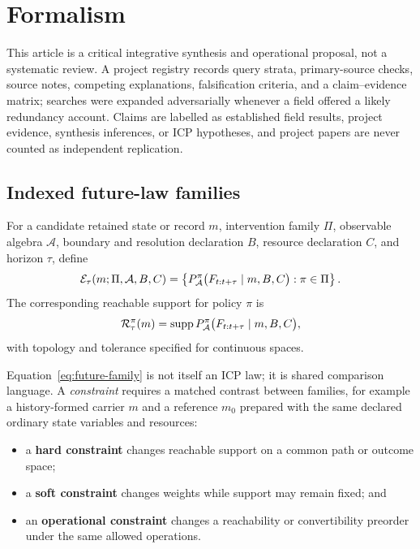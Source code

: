 \section{Formalism}
\label{sec:formalism}

This article is a critical integrative synthesis and operational proposal, not
a systematic review. A project registry records query strata, primary-source
checks, source notes, competing explanations, falsification criteria, and a
claim--evidence matrix; searches were expanded adversarially whenever a field
offered a likely redundancy account. Claims are labelled as established field
results, project evidence, synthesis inferences, or ICP hypotheses, and project
papers are never counted as independent replication.

\subsection{Indexed future-law families}

For a candidate retained state or record $m$, intervention family $\Pi$,
observable algebra $\mathcal A$, boundary and resolution declaration $B$,
resource declaration $C$, and horizon $\tau$, define
\begin{equation}
 \mathcal{E}_{\tau}(m;\Pi,\mathcal A,B,C)
 =\left\{P^{\pi}_{\mathcal A}
   \bigl(F_{t:t+\tau}\mid m,B,C\bigr):\pi\in\Pi\right\}.
 \label{eq:future-family}
\end{equation}
The corresponding reachable support for policy $\pi$ is
\begin{equation}
 \mathcal{R}^{\pi}_{\tau}(m)=
 \operatorname{supp}P^{\pi}_{\mathcal A}
 \bigl(F_{t:t+\tau}\mid m,B,C\bigr),
 \label{eq:reachable-support}
\end{equation}
with topology and tolerance specified for continuous spaces.

Equation~\eqref{eq:future-family} is not itself an ICP law; it is shared
comparison language. A \emph{constraint} requires a matched contrast between
families, for example a history-formed carrier $m$ and a reference $m_0$
prepared with the same declared ordinary state variables and resources:
\begin{itemize}
  \item a \textbf{hard constraint} changes reachable support on a common path
  or outcome space;
  \item a \textbf{soft constraint} changes weights while support may remain
  fixed; and
  \item an \textbf{operational constraint} changes a reachability or
  convertibility preorder under the same allowed operations.
\end{itemize}

